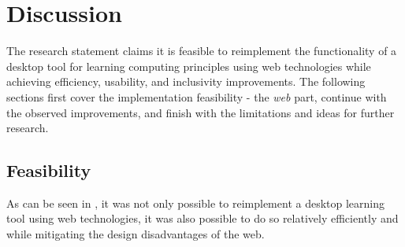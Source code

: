 \chapter{Discussion}
\label{Discussion}

The research statement claims it is feasible to reimplement the functionality of a desktop tool for learning computing principles using web technologies while achieving efficiency, usability, and inclusivity improvements.
The following sections first cover the implementation feasibility - the \textit{web} part, continue with the observed improvements, and finish with the limitations and ideas for further research.

\section{Feasibility}

As can be seen in , it was not only possible to reimplement a desktop learning tool using web technologies, it was also possible to do so relatively efficiently and while mitigating the design disadvantages of the web.


